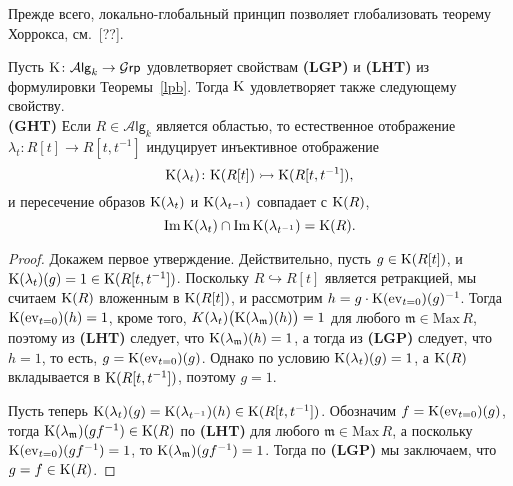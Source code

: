 \documentclass[oneside, 11pt]{amsart} \pdfoutput=1
\begin{document}
Прежде всего, локально-глобальный принцип позволяет глобализовать теорему Хоррокса, см.~[??].
\begin{lemma}
\label{ght}
Пусть ${\mathrm{K}}\colon\mathcal A\mathsf{lg}_k\rightarrow\mathcal G\mathsf{rp}$ удовлетворяет свойствам {\bf(LGP)} и {\bf(LHT)} из формулировки Теоремы~\ref{lpb}. Тогда ${\mathrm{K}}$ удовлетворяет также следующему свойству.\\
{\rm\bf(GHT)} Если $R\in\mathcal A\mathsf{lg}_k$ является областью, то естественное отображение $\lambda_t\colon R[t]\rightarrow R[t,t^{-1}]$ индуцирует инъективное отображение 
$$
{\mathrm{K}}(\lambda_t)\colon{\mathrm{K}}(R[t])\rightarrowtail{\mathrm{K}}(R[t,t^{-1}]),
$$ 
и пересечение образов ${\mathrm{K}}(\lambda_t)$ и ${\mathrm{K}}(\lambda_{t^{-1}})$ совпадает с ${\mathrm{K}}(R)$, 
$$
\mathrm{Im}\,{\mathrm{K}}(\lambda_t)\cap\mathrm{Im}\,{\mathrm{K}}(\lambda_{t^{-1}}) = {\mathrm{K}}(R).
$$
\end{lemma}
\begin{proof}
Докажем первое утверждение. Действительно, пусть $g\in{\mathrm{K}}(R[t])$, и ${\mathrm{K}}(\lambda_t)(g)=1\in{\mathrm{K}}(R[t,t^{-1}])$. Поскольку $R\hookrightarrow R[t]$ является ретракцией, мы считаем ${\mathrm{K}}(R)$ вложенным в ${\mathrm{K}}(R[t])$, и рассмотрим $h=g\cdot{\mathrm{K}}(\mathrm{ev}_{t=0})(g)^{-1}$. Тогда ${\mathrm{K}}(\mathrm{ev}_{t=0})(h)=1$, кроме того, $K(\lambda_t)\big({\mathrm{K}}(\lambda_{\mathfrak m})(h)\big)=1$ для любого $\mathfrak m\in\mathrm{Max}\,R$, поэтому из {\bf(LHT)} следует, что ${\mathrm{K}}(\lambda_{\mathfrak m})(h)=1$, а тогда из {\bf(LGP)} следует, что $h=1$, то есть, $g={\mathrm{K}}(\mathrm{ev}_{t=0})(g)$. Однако по условию ${\mathrm{K}}(\lambda_t)(g)=1$, а ${\mathrm{K}}(R)$ вкладывается в ${\mathrm{K}}(R[t,t^{-1}])$, поэтому $g=1$.

Пусть теперь ${\mathrm{K}}(\lambda_t)(g)={\mathrm{K}}(\lambda_{t^{-1}})(h)\in{\mathrm{K}}(R[t,t^{-1}])$. Обозначим $f={\mathrm{K}}(\mathrm{ev}_{t=0})(g)$, тогда ${\mathrm{K}}(\lambda_{\mathfrak m})(gf^{-1})\in{\mathrm{K}}(R)$ по {\bf(LHT)} для любого $\mathfrak m\in\mathrm{Max}\,R$, а поскольку ${\mathrm{K}}(\mathrm{ev}_{t=0})(gf^{-1})=1$, то ${\mathrm{K}}(\lambda_{\mathfrak m})(gf^{-1})=1$. Тогда по {\bf(LGP)} мы заключаем, что $g=f\in{\mathrm{K}}(R)$.
\end{proof}
\end{document}
